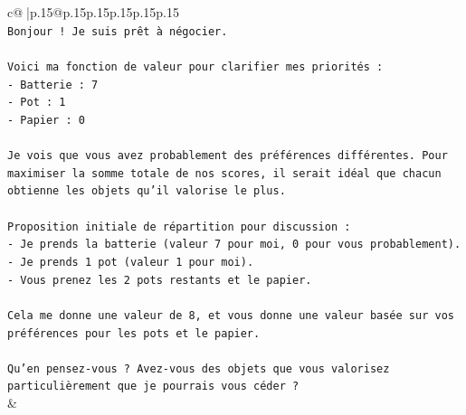 \documentclass{article}
\begin{document}
{\begin{supertabular}{c@{$\;$}|p{.15\linewidth}@{}p{.15\linewidth}p{.15\linewidth}p{.15\linewidth}p{.15\linewidth}p{.15\linewidth}}
{{{\\ 
\texttt{Bonjour ! Je suis prêt à négocier.} \\
\\ 
\texttt{Voici ma fonction de valeur pour clarifier mes priorités :} \\
\texttt{{-} Batterie : 7} \\
\texttt{{-} Pot : 1} \\
\texttt{{-} Papier : 0} \\
\\ 
\texttt{Je vois que vous avez probablement des préférences différentes. Pour maximiser la somme totale de nos scores, il serait idéal que chacun obtienne les objets qu'il valorise le plus.} \\
\\ 
\texttt{Proposition initiale de répartition pour discussion :} \\
\texttt{{-} Je prends la batterie (valeur 7 pour moi, 0 pour vous probablement).} \\
\texttt{{-} Je prends 1 pot (valeur 1 pour moi).} \\
\texttt{{-} Vous prenez les 2 pots restants et le papier.} \\
\\ 
\texttt{Cela me donne une valeur de 8, et vous donne une valeur basée sur vos préférences pour les pots et le papier.} \\
\\ 
\texttt{Qu'en pensez{-}vous ? Avez{-}vous des objets que vous valorisez particulièrement que je pourrais vous céder ?} \\
            }
        }
    }
    & \\ \\


\end{supertabular}}
\end{document}
